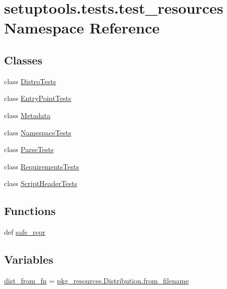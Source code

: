 \hypertarget{namespacesetuptools_1_1tests_1_1test__resources}{}\section{setuptools.\+tests.\+test\+\_\+resources Namespace Reference}
\label{namespacesetuptools_1_1tests_1_1test__resources}
\subsection*{Classes}
\begin{DoxyCompactItemize}
\item 
class \hyperlink{classsetuptools_1_1tests_1_1test__resources_1_1DistroTests}{Distro\+Tests}
\item 
class \hyperlink{classsetuptools_1_1tests_1_1test__resources_1_1EntryPointTests}{Entry\+Point\+Tests}
\item 
class \hyperlink{classsetuptools_1_1tests_1_1test__resources_1_1Metadata}{Metadata}
\item 
class \hyperlink{classsetuptools_1_1tests_1_1test__resources_1_1NamespaceTests}{Namespace\+Tests}
\item 
class \hyperlink{classsetuptools_1_1tests_1_1test__resources_1_1ParseTests}{Parse\+Tests}
\item 
class \hyperlink{classsetuptools_1_1tests_1_1test__resources_1_1RequirementsTests}{Requirements\+Tests}
\item 
class \hyperlink{classsetuptools_1_1tests_1_1test__resources_1_1ScriptHeaderTests}{Script\+Header\+Tests}
\end{DoxyCompactItemize}
\subsection*{Functions}
\begin{DoxyCompactItemize}
\item 
def \hyperlink{namespacesetuptools_1_1tests_1_1test__resources_aa1e6dc0234dd3750a9acd8c3e8281495}{safe\+\_\+repr}
\end{DoxyCompactItemize}
\subsection*{Variables}
\begin{DoxyCompactItemize}
\item 
\hyperlink{namespacesetuptools_1_1tests_1_1test__resources_a45704dcfde87cf7b14b30d8503261e05}{dist\+\_\+from\+\_\+fn} = \hyperlink{classpkg__resources_1_1Distribution_a1cded24f024d80b2c3470b55e03ab0a0}{pkg\+\_\+resources.\+Distribution.\+from\+\_\+filename}
\end{DoxyCompactItemize}


